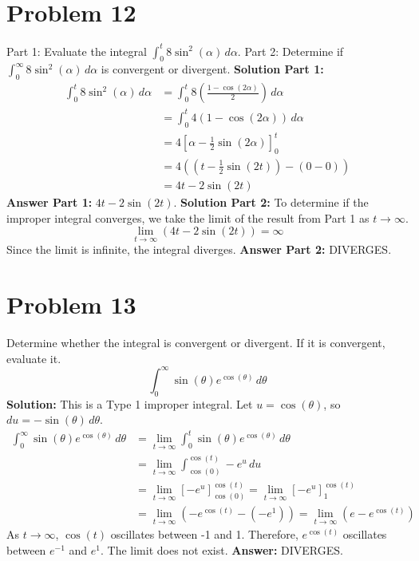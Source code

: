 \documentclass{article}
\begin{document}
\section{Problem 12}
Part 1: Evaluate the integral $\int_{0}^{t} 8\sin^2(\alpha) \,d\alpha$.
Part 2: Determine if $\int_{0}^{\infty} 8\sin^2(\alpha) \,d\alpha$ is convergent or divergent.
\textbf{Solution Part 1:}
\begin{align*}
    \int_{0}^{t} 8\sin^2(\alpha) \,d\alpha &= \int_{0}^{t} 8 \left( \frac{1 - \cos(2\alpha)}{2} \right) \,d\alpha \\
    &= \int_{0}^{t} 4(1 - \cos(2\alpha)) \,d\alpha \\
    &= 4 \left[ \alpha - \frac{1}{2}\sin(2\alpha) \right]_{0}^{t} \\
    &= 4 \left( \left(t - \frac{1}{2}\sin(2t)\right) - (0 - 0) \right) \\
    &= 4t - 2\sin(2t)
\end{align*}
\textbf{Answer Part 1:} $4t - 2\sin(2t)$.
\textbf{Solution Part 2:}
To determine if the improper integral converges, we take the limit of the result from Part 1 as $t \to \infty$.
\[ \lim_{t \to \infty} (4t - 2\sin(2t)) = \infty \]
Since the limit is infinite, the integral diverges.
\textbf{Answer Part 2:} DIVERGES.

\section{Problem 13}
Determine whether the integral is convergent or divergent. If it is convergent, evaluate it.
\[ \int_{0}^{\infty} \sin(\theta) e^{\cos(\theta)} \,d\theta \]
\textbf{Solution:}
This is a Type 1 improper integral. Let $u = \cos(\theta)$, so $du = -\sin(\theta)\,d\theta$.
\begin{align*}
    \int_{0}^{\infty} \sin(\theta) e^{\cos(\theta)} \,d\theta &= \lim_{t \to \infty} \int_{0}^{t} \sin(\theta) e^{\cos(\theta)} \,d\theta \\
    &= \lim_{t \to \infty} \int_{\cos(0)}^{\cos(t)} -e^u \,du \\
    &= \lim_{t \to \infty} [-e^u]_{\cos(0)}^{\cos(t)} = \lim_{t \to \infty} [-e^u]_{1}^{\cos(t)} \\
    &= \lim_{t \to \infty} (-e^{\cos(t)} - (-e^1)) = \lim_{t \to \infty} (e - e^{\cos(t)})
\end{align*}
As $t \to \infty$, $\cos(t)$ oscillates between -1 and 1. Therefore, $e^{\cos(t)}$ oscillates between $e^{-1}$ and $e^1$. The limit does not exist.
\textbf{Answer:} DIVERGES.
\end{document}
